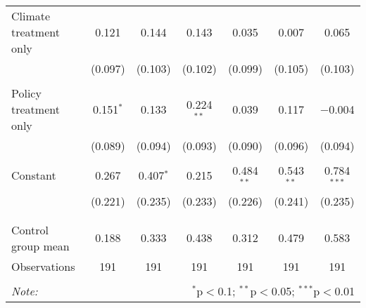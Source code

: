 \begin{tabular}{@{\extracolsep{5pt}}lcccccc}
 Climate treatment only & 0.121 & 0.144 & 0.143 & 0.035 & 0.007 & 0.065 \\ 
  & (0.097) & (0.103) & (0.102) & (0.099) & (0.105) & (0.103) \\ 
  & & & & & & \\ 
 Policy treatment only & 0.151$^{*}$ & 0.133 & 0.224$^{**}$ & 0.039 & 0.117 & $-$0.004 \\ 
  & (0.089) & (0.094) & (0.093) & (0.090) & (0.096) & (0.094) \\ 
  & & & & & & \\ 
 Constant & 0.267 & 0.407$^{*}$ & 0.215 & 0.484$^{**}$ & 0.543$^{**}$ & 0.784$^{***}$ \\ 
  & (0.221) & (0.235) & (0.233) & (0.226) & (0.241) & (0.235) \\ 
  & & & & & & \\ 
\hline \\[-1.8ex] 
Control group mean & 0.188 & 0.333 & 0.438 & 0.312 & 0.479 & 0.583 \\ 
Observations & 191 & 191 & 191 & 191 & 191 & 191 \\ 
\hline 
\hline \\[-1.8ex] 
\textit{Note:}  & \multicolumn{6}{r}{$^{*}$p$<$0.1; $^{**}$p$<$0.05; $^{***}$p$<$0.01} \\ 
\end{tabular} 

